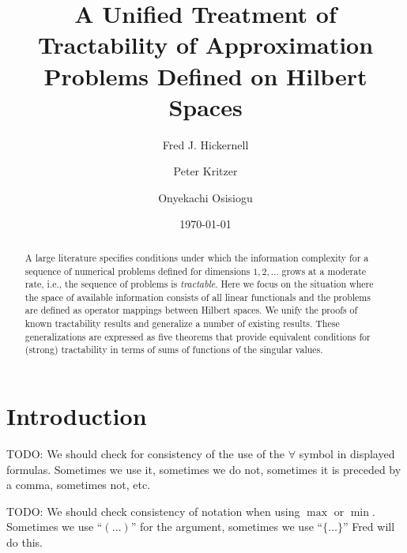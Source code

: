 \documentclass[sort&compress]{elsarticle}
\newcommand{\fred}[1]{\begingroup\color{blue}#1\endgroup}
\begin{document}
\title{A Unified Treatment of Tractability of Approximation Problems Defined on Hilbert Spaces}

\author[1]{Fred J. Hickernell}
\author[2]{Peter Kritzer}
\author[1]{Onyekachi Osisiogu}
\date{\today}


\begin{abstract}
    A large literature specifies conditions under which the information complexity for a sequence of numerical problems defined for dimensions $1, 2, \ldots$ grows at a moderate rate, i.e., the sequence of problems is \emph{tractable}.  Here we focus on the situation where the space of available information consists of all linear functionals and the problems are defined as operator mappings between Hilbert spaces.  We unify the proofs of known tractability results and generalize a number of existing results.  These generalizations are expressed as five theorems that provide equivalent conditions for (strong) tractability in terms of sums of functions of the singular values.  
\end{abstract}

\maketitle




\section{Introduction}



\medskip


TODO: We should check for consistency of the use of the $\forall$ symbol in displayed formulas. Sometimes we use it, sometimes we do not, sometimes it is preceded by a comma, sometimes not, etc. 

TODO: We should check consistency of notation when using $\max$ or $\min$. Sometimes we use ``$(\ldots)$'' for the argument, sometimes we use ``$\{\ldots\}$''  \fred{Fred will do this.}
\end{document}
